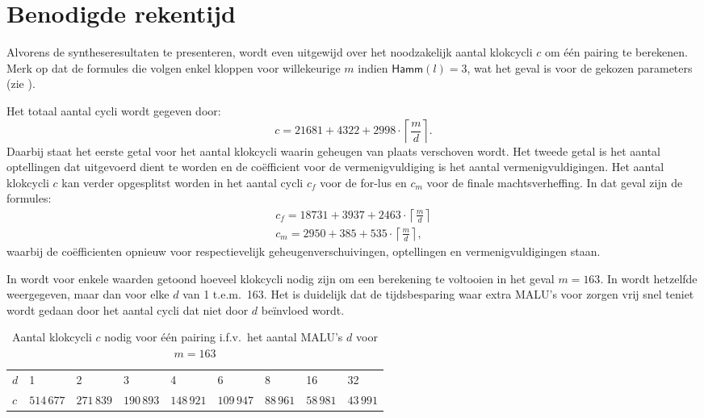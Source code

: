 \section{Benodigde rekentijd}

Alvorens de syntheseresultaten te presenteren, wordt even uitgewijd over het noodzakelijk aantal klokcycli $c$ om \'e\'en pairing te berekenen. Merk op dat de formules die volgen enkel kloppen voor willekeurige $m$ indien $\textsf{Hamm}(l) = 3$, wat het geval is voor de gekozen parameters (zie ).

Het totaal aantal cycli wordt gegeven door:
\[c = 21681 + 4322 + 2998 \cdot \left\lceil \frac{m}{d} \right\rceil.\]
Daarbij staat het eerste getal voor het aantal klokcycli waarin geheugen van plaats verschoven wordt. Het tweede getal is het aantal optellingen dat uitgevoerd dient te worden en de co\"efficient voor de vermenigvuldiging is het aantal vermenigvuldigingen. Het aantal klokcycli $c$ kan verder opgesplitst worden in het aantal cycli $c_f$ voor de for-lus en $c_m$ voor de finale machtsverheffing. In dat geval zijn de formules:
\[\begin{gathered}
c_f = 18731 + 3937 + 2463 \cdot \left\lceil \frac{m}{d} \right\rceil\\
c_m = 2950 + 385 + 535 \cdot \left\lceil \frac{m}{d} \right\rceil,
\end{gathered}\]
waarbij de co\"efficienten opnieuw voor respectievelijk geheugenverschuivingen, optellingen en vermenigvuldigingen staan.

In  wordt voor enkele waarden getoond hoeveel klokcycli nodig zijn om een berekening te voltooien in het geval $m = 163$. In  wordt hetzelfde weergegeven, maar dan voor elke $d$ van 1 t.e.m.\ 163. Het is duidelijk dat de tijdsbesparing waar extra MALU's voor zorgen vrij snel teniet wordt gedaan door het aantal cycli dat niet door $d$ be\"invloed wordt.

\begin{table}[h]
	\caption{Aantal klokcycli $c$ nodig voor \'e\'en pairing i.f.v.\ het aantal MALU's $d$ voor $m = 163$}
	\label{tabel-resultaten-multi-cycles}

	\begin{narrow}{-1cm}{-1cm}
		\centering
		\begin{tabular}{lllllllll}
			\toprule
			$d$	& 1	& 2	& 3	& 4	& 6	& 8	& 16	& 32\\
			$c$	& $514\,677$	& $271\,839$	& $190\,893$	& $148\,921$	& $109\,947$	& $88\,961$	& $58\,981$	& $43\,991$\\
			\bottomrule	
		\end{tabular}
	\end{narrow}
\end{table}

